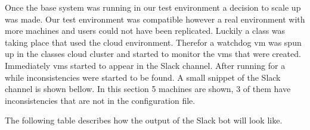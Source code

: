 \documentclass[12pt]{article}
\begin{document}
Once the base system was running in our test environment a decision to scale up was made. Our test environment was compatible however a real environment with more machines and users could not have been replicated. Luckily a class was taking place that used the cloud environment. Therefor a watchdog vm was spun up in the classes cloud cluster and started to monitor the vms that were created. Immediately vms started to appear in the Slack channel. After running for a while inconsistencies were started to be found. A small snippet of the Slack channel is shown bellow. In this section 5 machines are shown, 3 of them have inconsistencies that are not in the configuration file.

The following table describes how the output of the Slack bot will look like.

\begin{table}[H]
\centering
\caption{Slack Ouput Breakdown}
\label{Slack Ouput Breakdown}
\end{table}
\end{document}
